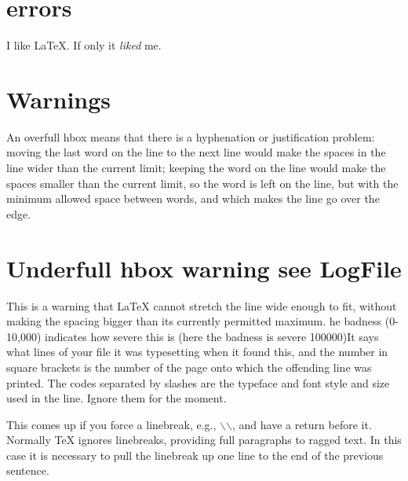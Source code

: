 \documentclass{article} %
\begin{document}
\section{errors} %

I like \LaTeX. If only it \emph{liked} me. %

\section{Warnings}

An overfull hbox means that there is a hyphenation or justification problem: moving the last word on the line to the next line would make the spaces in the line wider than the current limit; keeping the word on the line would make the spaces smaller than the current limit, so the word is left on the line, but with the minimum allowed space between words, and which makes the line go over the edge.


\section{Underfull hbox warning see LogFile}

This is a warning that LaTeX cannot stretch the line wide enough to fit, without making the spacing bigger than its currently permitted maximum. he badness (0-10,000) indicates how severe this is (here the badness is severe 100000)It says what lines of your file it was typesetting when it found this, and the number in square brackets is the number of the page onto which the offending line was printed. The codes separated by slashes are the typeface and font style and size used in the line. Ignore them for the moment.

This comes up if you force a linebreak, e.g., $\backslash$$\backslash$, and have a return before it. Normally TeX ignores linebreaks, providing full paragraphs to ragged text. In this case it is necessary to pull the linebreak up one line to the end of the previous sentence.
\end{document}
